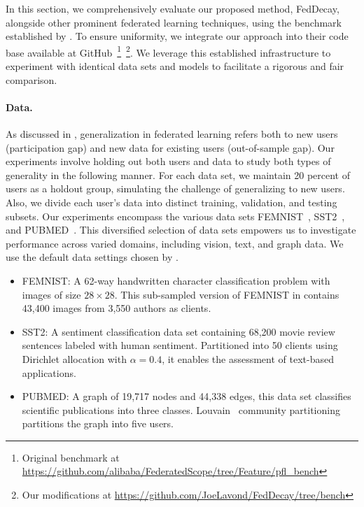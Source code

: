 In this section, we comprehensively evaluate our proposed method, FedDecay, alongside other prominent federated learning techniques, using the benchmark established by \citet{pfl-bench}.
To ensure uniformity, we integrate our approach into their code base available at GitHub~\footnote{Original benchmark at  \url{https://github.com/alibaba/FederatedScope/tree/Feature/pfl_bench}}~\footnote{Our modifications at \url{https://github.com/JoeLavond/FedDecay/tree/bench}}.
We leverage this established infrastructure to experiment with identical data sets and models to facilitate a rigorous and fair comparison.

\paragraph{Data.} 
As discussed in \citet{generalization}, generalization in federated learning refers both to new users (participation gap) and new data for existing users (out-of-sample gap).
Our experiments involve holding out both users and data to study both types of generality in the following manner.
For each data set, we maintain 20 percent of users as a holdout group, simulating the challenge of generalizing to new users.
Also, we divide each user's data into distinct training, validation, and testing subsets.
Our experiments encompass the various data sets FEMNIST~\citep{femnist}, SST2~\citep{sst-92, sst-94}, and PUBMED~\citep{pubmed}.
This diversified selection of data sets empowers us to investigate performance across varied domains, including vision, text, and graph data.
We use the default data settings chosen by \citet{pfl-bench}.
\begin{itemize}
    \item FEMNIST: A 62-way handwritten character classification problem with images of size $28 \times 28$.
    This sub-sampled version of FEMNIST in \citet{pfl-bench} contains 43,400 images from 3,550 authors as clients.
    \item SST2: A sentiment classification data set containing 68,200 movie review sentences labeled with human sentiment.
    Partitioned into 50 clients using Dirichlet allocation with $\alpha = 0.4$, it enables the assessment of text-based applications.
    \item PUBMED: A graph of 19,717 nodes and 44,338 edges, this data set classifies scientific publications into three classes.
    Louvain~\citep{louvain} community partitioning partitions the graph into five users.
\end{itemize}

